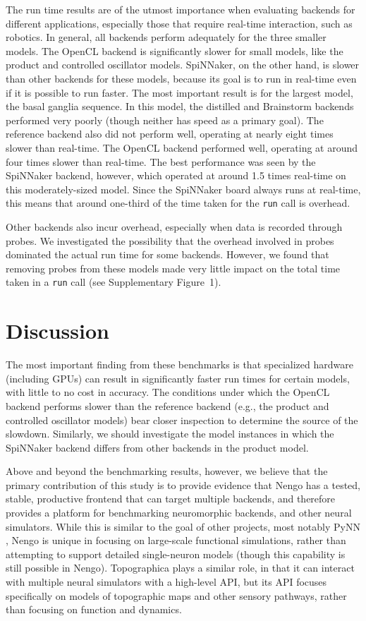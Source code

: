 \documentclass{frontiersSCNS}
\begin{document}
The run time results are of the utmost importance
when evaluating backends for different applications,
especially those that require real-time interaction,
such as robotics. In general, all backends
perform adequately for the three smaller models.
The OpenCL backend is significantly slower for small
models, like the product and controlled oscillator models.
SpiNNaker, on the other hand, is slower than other backends
for these models, because its goal
is to run in real-time even if it is possible to run faster.
The most important result is for the largest model,
the basal ganglia sequence.
In this model, the distilled and Brainstorm backends
performed very poorly
(though neither has speed as a primary goal).
The reference backend also did not perform well,
operating at nearly eight times slower than real-time.
The OpenCL backend performed well, operating at around
four times slower than real-time.
The best performance was seen by the SpiNNaker backend,
however, which operated at around 1.5 times real-time
on this moderately-sized model.
Since the SpiNNaker board always runs at real-time,
this means that around one-third of the time taken
for the \texttt{run} call is overhead.

Other backends also incur overhead,
especially when data is recorded
through probes.
We investigated the possibility
that the overhead involved in probes
dominated the actual run time for some backends.
However, we found that
removing probes from these models
made very little impact on
the total time taken in a \texttt{run} call
(see Supplementary Figure~1).

\section{Discussion}

The most important finding from these benchmarks
is that specialized hardware (including GPUs)
can result in significantly faster run times
for certain models,
with little to no cost in accuracy.
The conditions under which the OpenCL backend
performs slower than the reference backend
(e.g., the product and controlled oscillator models)
bear closer inspection to determine the source
of the slowdown.
Similarly, we should investigate
the model instances in which the SpiNNaker backend
differs from other backends
in the product model.

Above and beyond the benchmarking results,
however, we believe that the primary contribution
of this study is to provide evidence that Nengo
has a tested, stable, productive frontend
that can target multiple backends,
and therefore provides a platform
for benchmarking neuromorphic backends,
and other neural simulators.
While this is similar to the goal
of other projects, most notably PyNN \cite{davison2008},
Nengo is unique in focusing on
large-scale functional simulations,
rather than attempting to support
detailed single-neuron models
(though this capability is still possible in Nengo).
Topographica \cite{bednar2009} plays a similar role,
in that it can interact with multiple neural simulators
with a high-level API, but its API focuses specifically
on models of topographic maps
and other sensory pathways,
rather than focusing on function and dynamics.
\end{document}
